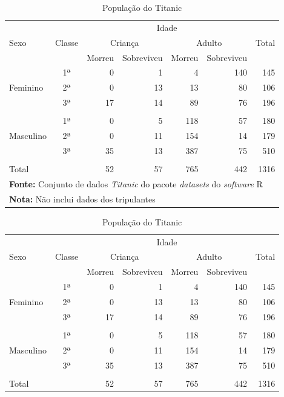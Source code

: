 \documentclass[12pt]{article}   %
\begin{document}
		\begin{table}[h!]
			\centering
			\caption{População do Titanic}
			\label{tab_tit}
			\begin{tabular}{l|c|r|r|r|r|r}
				\hline
				&&\multicolumn{4}{c|}{Idade}&\\
				\cline{3-6}
				Sexo&Classe&\multicolumn{2}{c|}{Criança}&\multicolumn{2}{c|}{Adulto}&Total\\
				\cline{3-6}
				&&Morreu&Sobreviveu&Morreu&Sobreviveu&\\
				\hline
				&1ª&0&1&4&140&145\\
				Feminino&2ª&0&13&13&80&106\\
				&3ª&17&14&89&76&196\\
				&&&&&&\\
				\hline
				&1ª&0&5&118&57&180\\
				Masculino&2ª&0&11&154&14&179\\
				&3ª&35&13&387&75&510\\
				&&&&&&\\
				\hline
				Total&&52&57&765&442&1316\\
				\hline
				\multicolumn{7}{l}{\textbf{Fonte:} Conjunto de dados \textit{Titanic} do pacote \textit{datasets} do \textit{software} R}\\
				\multicolumn{7}{l}{\textbf{Nota:} Não inclui dados dos tripulantes}
			\end{tabular}
		\end{table}

		\begin{table}[h!]
			\centering
			\caption{População do Titanic}
			\label{tab_tit2}
			\begin{tabular}{lc|rrrr|r}
				\hline
				&&\multicolumn{4}{c|}{Idade}&\\
				Sexo&Classe&\multicolumn{2}{c}{Criança}&\multicolumn{2}{c|}{Adulto}&Total\\
				&&Morreu&Sobreviveu&Morreu&Sobreviveu&\\
				\hline
				&1ª&0&1&4&140&145\\
				Feminino&2ª&0&13&13&80&106\\
				&3ª&17&14&89&76&196\\
				&&&&&&\\
				&1ª&0&5&118&57&180\\
				Masculino&2ª&0&11&154&14&179\\
				&3ª&35&13&387&75&510\\
				&&&&&&\\
				\hline
				Total&&52&57&765&442&1316\\
				\hline
			\end{tabular}
		\end{table}
\end{document}
